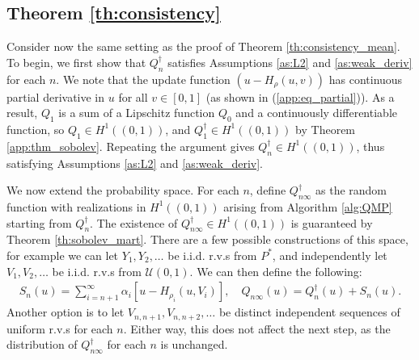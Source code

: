 \documentclass[11pt,a4paper]{article}
\begin{document}
\begin{appendices}
\subsection{Theorem \ref{th:consistency}}





Consider now the same setting as the proof of {Theorem \ref{th:consistency_mean}}. 
To begin, we first show that $Q_n^{\dagger}$ satisfies {Assumptions \ref{as:L2}} and {\ref{as:weak_deriv}} for each $n$. We note that the update function $(u-H_\rho(u,v))$ has continuous partial derivative in $u$ for all $v \in [0,1]$ (as shown in (\ref{app:eq_partial})). As a result, $Q_1$ is a sum of a Lipschitz function $Q_0$ and a continuously differentiable function, so $Q_1\in H^1((0,1))$, and $Q_1^{\dagger}\in H^{1}((0,1))$ by {Theorem \ref{app:thm_sobolev}}. Repeating the argument gives $Q_n^{\dagger}\in H^1((0,1))$, thus satisfying {Assumptions \ref{as:L2}} and {\ref{as:weak_deriv}}.




We now extend the probability space. For each $n$, define $Q_{n\infty}^{\dagger}$ as the random function with realizations in $H^1((0,1))$ arising from {Algorithm \ref{alg:QMP}} starting from $Q_n^{\dagger}$. The existence of $Q_{n\infty}^{\dagger}\in H^{1}((0,1))$  is guaranteed by {Theorem \ref{th:sobolev_mart}}. There are a few possible constructions of this space, for example we can let $Y_1,Y_2,\ldots$ be i.i.d. r.v.s from $P^*$, and independently let $V_1,V_2,\ldots$ be i.i.d. r.v.s from $\mathcal{U}(0,1)$. We can then {define} the following:
\begin{align*}
    S_n(u) =  \sum_{i = n+1}^\infty \alpha_i[u- H_{\rho_i}(u,V_i)], \quad Q_{n\infty}(u) = Q_n^{\dagger}(u) + S_n(u).
\end{align*}
Another option is to let $V_{n,n+1}, V_{n,n+2},\ldots$ be distinct independent sequences of uniform r.v.s for each $n$. Either way, this does not affect the next step, as the distribution of $Q_{n\infty}^{\dagger}$ for each $n$ is unchanged.


\end{appendices}
\end{document}
